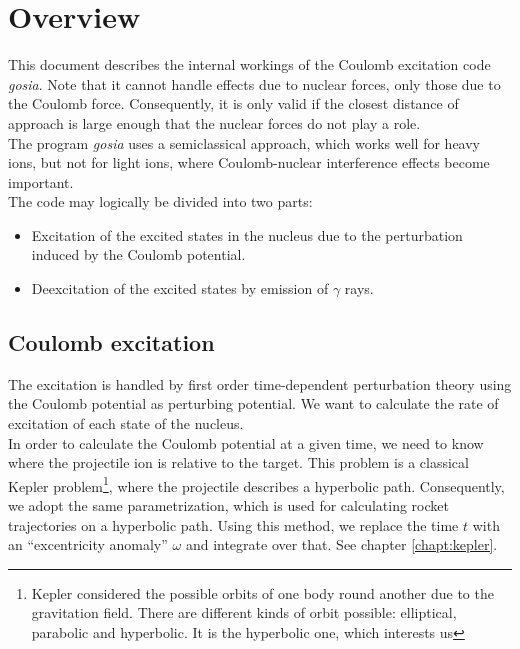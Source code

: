 \chapter{Overview}
\label{chapt:overview}

This document describes the internal workings of the Coulomb excitation code
{\em gosia}. Note that it cannot handle effects due to nuclear forces, only
those due to the Coulomb force. Consequently, it is only valid if the
closest distance of approach is large enough that the nuclear forces do not
play a role.\\

The program {\em gosia} uses a semiclassical approach, which works well for
heavy ions, but not for light ions, where Coulomb-nuclear interference
effects become important.\\

The code may logically be divided into two parts:\\

\begin{itemize}
\item Excitation of the excited states in the nucleus due to the
perturbation induced by the Coulomb potential.
\item Deexcitation of the excited states by emission of $\gamma$ rays.
\end{itemize}

\section{Coulomb excitation}

The excitation is handled by first order time-dependent perturbation theory
using the Coulomb potential as perturbing potential. We want to calculate
the rate of excitation of each state of the nucleus.\\

In order to calculate the Coulomb potential at a given time, we need to know
where the projectile ion is relative to the target. This problem is a
classical Kepler problem\footnote{Kepler considered the possible orbits of
one body round another due to the gravitation field. There are different
kinds of orbit possible: elliptical, parabolic and hyperbolic. It is the
hyperbolic one, which interests us}, where the projectile describes a
hyperbolic path. Consequently, we adopt the same parametrization, which is
used for calculating rocket trajectories on a hyperbolic path. Using this
method, we replace the time $t$ with an ``excentricity anomaly'' $\omega$
and integrate over that. See chapter \ref{chapt:kepler}.\\

